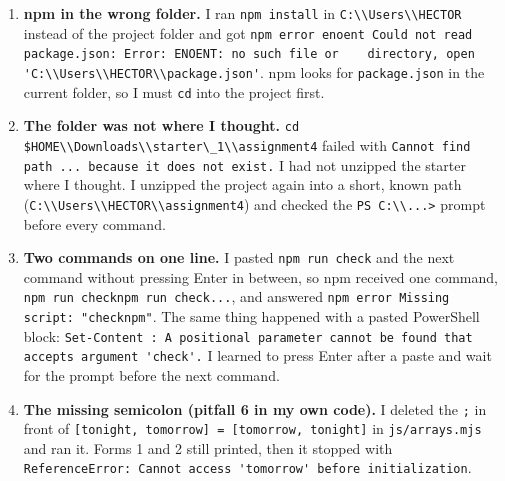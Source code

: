\documentclass[
]{article}
\newcommand{\passthrough}[1]{#1}
\providecommand{\tightlist}{%
  \setlength{\itemsep}{0pt}\setlength{\parskip}{0pt}}
\begin{document}
\begin{enumerate}
\def\labelenumi{\arabic{enumi}.}
\tightlist
\item
  \textbf{npm in the wrong folder.} I ran
  \passthrough{\lstinline!npm install!} in
  \passthrough{\lstinline!C:\\Users\\HECTOR!} instead of the project
  folder and got
  \passthrough{\lstinline!npm error enoent Could not read package.json: Error: ENOENT: no such file or    directory, open 'C:\\Users\\HECTOR\\package.json'!}.
  npm looks for \passthrough{\lstinline!package.json!} in the current
  folder, so I must \passthrough{\lstinline!cd!} into the project first.
\item
  \textbf{The folder was not where I thought.}
  \passthrough{\lstinline!cd $HOME\\Downloads\\starter\_1\\assignment4!}
  failed with
  \passthrough{\lstinline!Cannot find path ... because it does not exist.!}
  I had not unzipped the starter where I thought. I unzipped the project
  again into a short, known path
  (\passthrough{\lstinline!C:\\Users\\HECTOR\\assignment4!}) and checked
  the \passthrough{\lstinline!PS C:\\...>!} prompt before every command.
\item
  \textbf{Two commands on one line.} I pasted
  \passthrough{\lstinline!npm run check!} and the next command without
  pressing Enter in between, so npm received one command,
  \passthrough{\lstinline!npm run checknpm run check...!}, and answered
  \passthrough{\lstinline!npm error Missing script: "checknpm"!}. The
  same thing happened with a pasted PowerShell block:
  \passthrough{\lstinline!Set-Content : A positional parameter cannot be found that accepts argument 'check'.!}
  I learned to press Enter after a paste and wait for the prompt before
  the next command.
\item
  \textbf{The missing semicolon (pitfall 6 in my own code).} I deleted
  the \passthrough{\lstinline!;!} in front of
  \passthrough{\lstinline![tonight, tomorrow] = [tomorrow, tonight]!} in
  \passthrough{\lstinline!js/arrays.mjs!} and ran it. Forms 1 and 2
  still printed, then it stopped with
  \passthrough{\lstinline!ReferenceError: Cannot access 'tomorrow' before initialization!}.

\end{enumerate}
\end{document}
